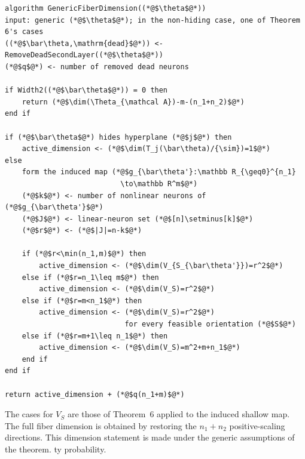\documentclass[11pt]{article}
\begin{document}
\begin{lstlisting}[caption={Dimension of the generic fiber modulo (*@$\sim$@*)}]
algorithm GenericFiberDimension((*@$\theta$@*))
input: generic (*@$\theta$@*); in the non-hiding case, one of Theorem 6's cases
((*@$\bar\theta,\mathrm{dead}$@*)) <- RemoveDeadSecondLayer((*@$\theta$@*))
(*@$q$@*) <- number of removed dead neurons

if Width2((*@$\bar\theta$@*)) = 0 then
    return (*@$\dim(\Theta_{\mathcal A})-m-(n_1+n_2)$@*)
end if

if (*@$\bar\theta$@*) hides hyperplane (*@$j$@*) then
    active_dimension <- (*@$\dim(T_j(\bar\theta)/{\sim})=1$@*)
else
    form the induced map (*@$g_{\bar\theta'}:\mathbb R_{\geq0}^{n_1}
                           \to\mathbb R^m$@*)
    (*@$k$@*) <- number of nonlinear neurons of (*@$g_{\bar\theta'}$@*)
    (*@$J$@*) <- linear-neuron set (*@$[n]\setminus[k]$@*)
    (*@$r$@*) <- (*@$|J|=n-k$@*)

    if (*@$r<\min(n_1,m)$@*) then
        active_dimension <- (*@$\dim(V_{S_{\bar\theta'}})=r^2$@*)
    else if (*@$r=n_1\leq m$@*) then
        active_dimension <- (*@$\dim(V_S)=r^2$@*)
    else if (*@$r=m<n_1$@*) then
        active_dimension <- (*@$\dim(V_S)=r^2$@*)
                            for every feasible orientation (*@$S$@*)
    else if (*@$r=m+1\leq n_1$@*) then
        active_dimension <- (*@$\dim(V_S)=m^2+m+n_1$@*)
    end if
end if

return active_dimension + (*@$q(n_1+m)$@*)
\end{lstlisting}

The cases for \(V_S\) are those of Theorem~6 applied to the induced shallow
map.  The full fiber dimension is obtained by restoring the \(n_1+n_2\)
positive-scaling directions.  This dimension statement is made under the
generic assumptions of the theorem.
ty
probability.
\end{document}
